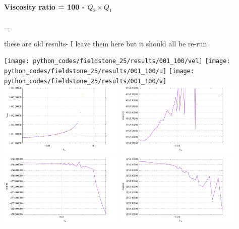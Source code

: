 \newpage
\paragraph{Viscosity ratio = 100 - $Q_2\times Q_1$}...

{\color{red} these are old results- I leave them here but it should all be re-run}

\begin{center}
\texttt{[image: python\_codes/fieldstone\_25/results/001\_100/vel]}
\texttt{[image: python\_codes/fieldstone\_25/results/001\_100/u]}
\texttt{[image: python\_codes/fieldstone\_25/results/001\_100/v]}\\
\includegraphics[width=6cm]{python_codes/fieldstone_25/results/vrms_001.pdf}
\includegraphics[width=6cm]{python_codes/fieldstone_25/results/max_vel_001.pdf}\\
\includegraphics[width=6cm]{python_codes/fieldstone_25/results/min_u_001.pdf}
\includegraphics[width=6cm]{python_codes/fieldstone_25/results/max_u_001.pdf}\\

\end{center}
